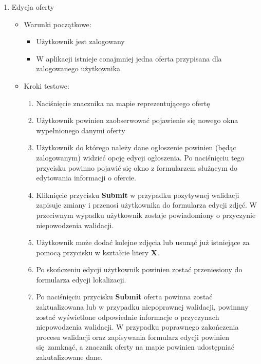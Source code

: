 \begin{enumerate}
 \item Edycja oferty
  \begin{itemize}
   \item Warunki początkowe:
    \begin{itemize}
     \item Użytkownik jest zalogowany
     \item W aplikacji istnieje conajmniej jedna oferta przypisana dla zalogowanego użytkownika
    \end{itemize}
   \item Kroki testowe:
    \begin{enumerate}
     \item Naciśnięcie znacznika na mapie reprezentującego ofertę
     \item Użytkownik powinien zaobserwować pojawienie się nowego okna wypełnionego danymi oferty
     \item Użytkownik do którego należy dane ogłoszenie powinien (będąc zalogowanym) widzieć opcję edycji ogłoszenia. Po naciśnięciu tego przycisku powinno pojawić się okno z formularzem służącym do edytowania informacji o ofercie.
     \item Kliknięcie przycisku \textbf{Submit} w przypadku pozytywnej walidacji zapisuje zmiany i przenosi użytkownika do formularza edycji zdjęć. W przeciwnym wypadku użytkownik zostaje powiadomiony o przyczynie niepowodzenia walidacji.
     \item Użytkownik może dodać kolejne zdjęcia lub usunąć już istniejące za pomocą przycisku w kształcie litery \textbf{X}.
     \item Po skończeniu edycji użytkownik powinien zostać przeniesiony do formularza edycji lokalizacji.
     \item Po naciśnięciu przycisku \textbf{Submit} oferta powinna zostać zaktualizowana lub w przypadku niepoprawnej walidacji, powinnny zostać wyświetlone odpowiednie informacje o przyczynach niepowodzenia walidacji. W przypadku poprawnego zakończenia procesu walidacji oraz zapisywania formularz edycji powinien się zamknąć, a znacznik oferty na mapie powinien udostępniać zakutalizowane dane.
    \end{enumerate}
  \end{itemize} 


\end{enumerate}
